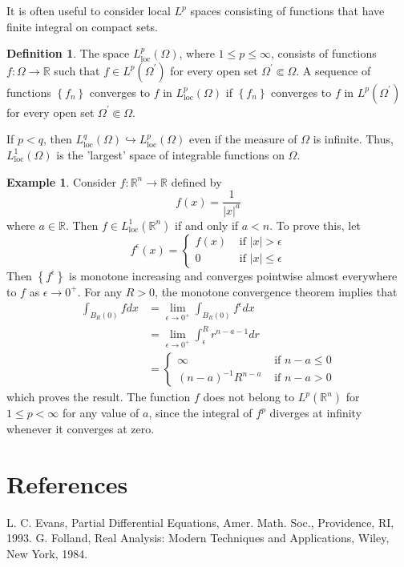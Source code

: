 \documentclass[10pt]{article}
\theoremstyle{plain}
\theoremstyle{definition}
\newtheorem{definition}[theorem]{Definition}
\newtheorem{example}[theorem]{Example}
\theoremstyle{remark}
\begin{document}
It is often useful to consider local $L^{p}$ spaces consisting of functions that have finite integral on compact sets.

\begin{definition}
The space $L_{\mathrm{loc}}^{p}(\Omega)$, where $1 \leq p \leq \infty$, consists of functions $f: \Omega \rightarrow \mathbb{R}$ such that $f \in L^{p}\left(\Omega^{\prime}\right)$ for every open set $\Omega^{\prime} \Subset \Omega$. A sequence of functions $\left\{f_{n}\right\}$ converges to $f$ in $L_{\mathrm{loc}}^{p}(\Omega)$ if $\left\{f_{n}\right\}$ converges to $f$ in $L^{p}\left(\Omega^{\prime}\right)$ for every open set $\Omega^{\prime} \Subset \Omega$.
\end{definition}

If $p<q$, then $L_{\mathrm{loc}}^{q}(\Omega) \hookrightarrow L_{\mathrm{loc}}^{p}(\Omega)$ even if the measure of $\Omega$ is infinite. Thus, $L_{\mathrm{loc}}^{1}(\Omega)$ is the 'largest' space of integrable functions on $\Omega$.

\begin{example}
Consider $f: \mathbb{R}^{n} \rightarrow \mathbb{R}$ defined by
$$
f(x)=\frac{1}{|x|^{a}}
$$
where $a \in \mathbb{R}$. Then $f \in L_{\text{loc}}^{1}\left(\mathbb{R}^{n}\right)$ if and only if $a<n$. To prove this, let
$$
f^{\epsilon}(x)= \begin{cases}f(x) & \text{ if }|x|>\epsilon \\ 0 & \text{ if }|x| \leq \epsilon\end{cases}
$$
Then $\left\{f^{\epsilon}\right\}$ is monotone increasing and converges pointwise almost everywhere to $f$ as $\epsilon \rightarrow 0^{+}$. For any $R>0$, the monotone convergence theorem implies that
$$
\begin{aligned}
\int_{B_{R}(0)} f dx & =\lim_{\epsilon \rightarrow 0^{+}} \int_{B_{R}(0)} f^{\epsilon} dx \\
& =\lim_{\epsilon \rightarrow 0^{+}} \int_{\epsilon}^{R} r^{n-a-1} dr \\
& = \begin{cases}\infty & \text{ if } n-a \leq 0 \\
(n-a)^{-1} R^{n-a} & \text{ if } n-a>0\end{cases}
\end{aligned}
$$
which proves the result. The function $f$ does not belong to $L^{p}\left(\mathbb{R}^{n}\right)$ for $1 \leq p<\infty$ for any value of $a$, since the integral of $f^{p}$ diverges at infinity whenever it converges at zero.
\end{example}

\section{References}
\begin{thebibliography}{99}
 L. C. Evans, Partial Differential Equations, Amer. Math. Soc., Providence, RI, 1993.
 G. Folland, Real Analysis: Modern Techniques and Applications, Wiley, New York, 1984.
\end{thebibliography}
\end{document}
